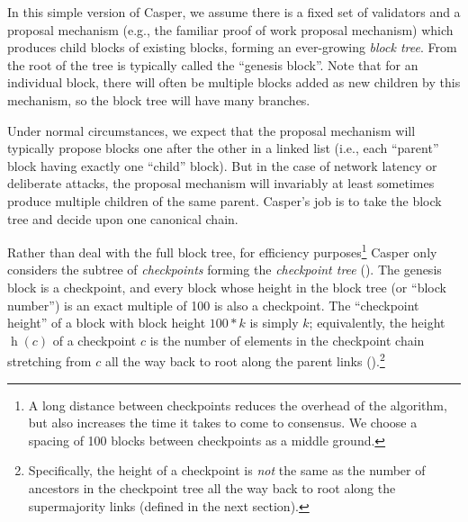 \documentclass[12pt]{article}
\newcommand{\h}{\operatorname{h}\xspace}
\begin{document}
In this simple version of Casper, we assume there is a fixed set of validators and a proposal mechanism (e.g., the familiar proof of work proposal mechanism) which produces child blocks of existing blocks, forming an ever-growing \emph{block tree}.  From \cite{nakamoto} the root of the tree is typically called the ``genesis block''.  Note that for an individual block, there will often be multiple blocks added as new children by this mechanism, so the block tree will have many branches.



Under normal circumstances, we expect that the proposal mechanism will typically propose blocks one after the other in a linked list (i.e., each ``parent'' block having exactly one ``child'' block).  But in the case of network latency or deliberate attacks, the proposal mechanism will invariably at least sometimes produce multiple children of the same parent. Casper's job is to take the block tree and decide upon one canonical chain.


Rather than deal with the full block tree, for efficiency purposes\footnote{A long distance between checkpoints reduces the overhead of the algorithm, but also increases the time it takes to come to consensus.  We choose a spacing of 100 blocks between checkpoints as a middle ground.} Casper only considers the subtree of \emph{checkpoints} forming the \emph{checkpoint tree} ().  The genesis block is a checkpoint, and every block whose height in the block tree (or “block number”) is an exact multiple of 100 is also a checkpoint. The ``checkpoint height'' of a block with block height $100 * k$ is simply $k$; equivalently, the height $\h(c)$ of a checkpoint $c$ is the number of elements in the checkpoint chain stretching from $c$ all the way back to root along the parent links ().\footnote{Specifically, the height of a checkpoint is \emph{not} the same as the number of ancestors in the checkpoint tree all the way back to root along the supermajority links (defined in the next section).}
   
\end{document}
